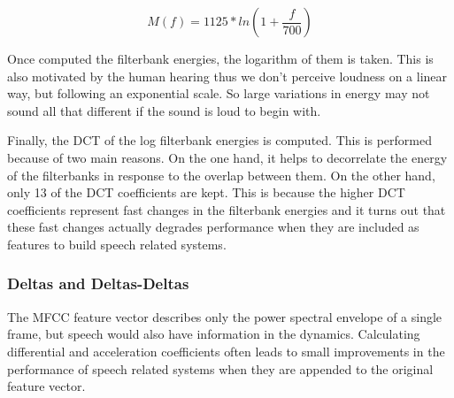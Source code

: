 \begin{equation}
M(f)=1125*ln(1 + \frac{f}{700})
\end{equation}

Once computed the filterbank energies, the logarithm of them is taken. This is also motivated by
the human hearing thus we don't perceive loudness on a linear way, but following an exponential
scale. So large variations in energy may not sound all that different if the sound is loud to 
begin with.

Finally, the DCT of the log filterbank energies is computed. This is performed because of  
two main reasons. On the one hand, it helps to decorrelate the energy of the filterbanks
in response to the overlap between them. On the other hand, only 13 of the DCT coefficients
are kept. This is because the higher DCT coefficients represent fast changes in the filterbank
energies and it turns out that these fast changes actually degrades performance 
when they are included as features to build speech related systems.


\subsubsection{Deltas and Deltas-Deltas}

The MFCC feature vector describes only the power spectral envelope of a single frame, but speech
would also have information in the dynamics.	 
Calculating differential and acceleration coefficients often leads to small improvements  
in the performance of speech related systems when they are appended to the original feature vector.

